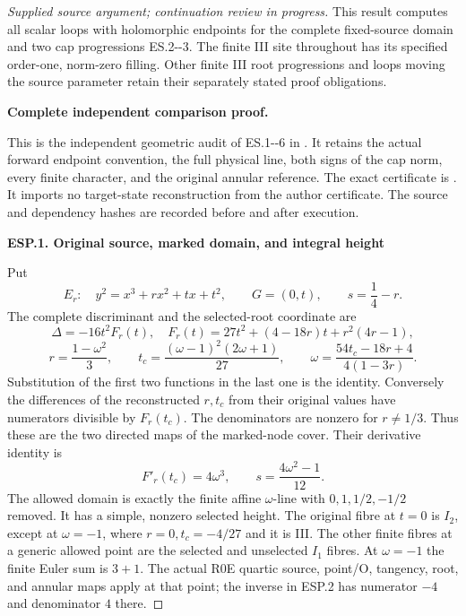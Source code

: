 \begin{proof}[Supplied source argument; continuation review in progress]
This result computes all scalar loops with
holomorphic endpoints for the complete fixed-source
domain and two cap progressions ES.2-\/-3. The
finite III site throughout has its specified
order-one, norm-zero filling. Other finite
III root progressions and loops moving the
source parameter retain their separately
stated proof obligations.


\par\bigskip\noindent\textbf{Complete independent comparison proof.}\par\nobreak

This is the independent geometric audit of ES.1-\/-6 in
. It retains the actual
forward endpoint convention, the full physical line, both signs of the
cap norm, every finite character, and the original annular reference.
The exact certificate is .
It imports no target-state reconstruction from the author certificate.
The source and dependency hashes are recorded before and after execution.

\par

\medskip\noindent\textbf{ESP.1. Original source, marked domain, and integral height}

\par\nobreak

Put
\[
 E_r:\quad y^2=x^3+rx^2+tx+t^2,\qquad G=(0,t),
 \qquad s=\frac14-r.
 \tag{ESP.1}
\]
The complete discriminant and the selected-root coordinate are
\[
 \Delta=-16t^2F_r(t),\quad
 F_r(t)=27t^2+(4-18r)t+r^2(4r-1),
\]
\[
 r=\frac{1-\omega^2}{3},\qquad
 t_c=\frac{(\omega-1)^2(2\omega+1)}{27},\qquad
 \omega=\frac{54t_c-18r+4}{4(1-3r)}.
 \tag{ESP.2}
\]
Substitution of the first two functions in the last one is the
identity. Conversely the differences of the reconstructed \(r,t_c\)
from their original values have numerators divisible by \(F_r(t_c)\).
The denominators are nonzero for \(r\ne1/3\). Thus these are the
two directed maps of the marked-node cover. Their derivative identity is
\[
                 F'_r(t_c)=4\omega^3,
 \qquad s=\frac{4\omega^2-1}{12}.
 \tag{ESP.3}
\]
The allowed domain is exactly the finite affine \(\omega\)-line with
\(0,1,1/2,-1/2\) removed. It has a simple, nonzero selected height.
The original fibre at \(t=0\) is \(I_2\), except at \(\omega=-1\),
where \(r=0,t_c=-4/27\) and it is III. The other finite fibres at a
generic allowed point are the selected and unselected \(I_1\) fibres.
At \(\omega=-1\) the finite Euler sum is \(3+1\). The actual R0E
quartic source, point/O, tangency, root, and annular maps apply at that
point; the inverse in ESP.2 has numerator \(-4\) and denominator
\(4\) there.


\end{proof}
